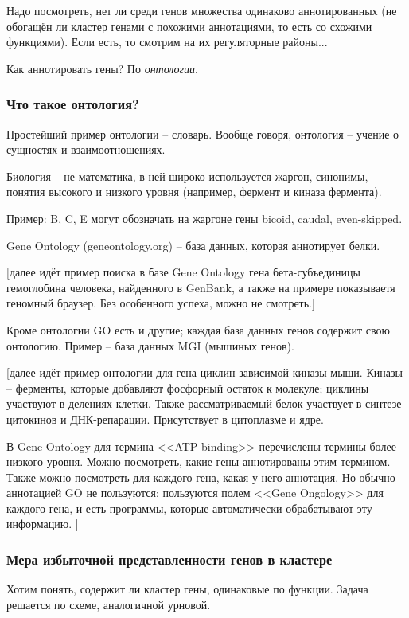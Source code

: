 \documentclass[main.tex]{subfiles}
\begin{document}

Надо посмотреть, нет ли среди генов множества одинаково аннотированных (не обогащён ли кластер генами с похожими аннотациями, то есть со схожими функциями).
Если есть, то смотрим на их регуляторные районы...

Как аннотировать гены?
По \emph{онтологии}.

\subsubsection{Что такое онтология?}
Простейший пример онтологии -- словарь.
Вообще говоря, онтология -- учение о сущностях и взаимоотношениях.

Биология -- не математика, в ней широко используется жаргон, синонимы, понятия высокого и низкого уровня (например, фермент и киназа фермента).

Пример: B, C, E могут обозначать на жаргоне гены bicoid, caudal, even-skipped.

Gene Ontology (geneontology.org) -- база данных, которая аннотирует белки.

[далее идёт пример поиска в базе Gene Ontology гена бета-субъединицы гемоглобина человека, найденного в GenBank, а также на примере показываетя геномный браузер. Без особенного успеха, можно не смотреть.]

Кроме онтологии GO есть и другие; каждая база данных генов содержит свою онтологию.
Пример -- база данных MGI (мышиных генов).

[далее идёт пример онтологии для гена циклин-зависимой киназы мыши.
Киназы -- ферменты, которые добавляют фосфорный остаток к молекуле; циклины участвуют в делениях клетки.
Также рассматриваемый белок участвует в синтезе цитокинов и ДНК-репарации.
Присутствует в цитоплазме и ядре.

В Gene Ontology для термина <<ATP binding>> перечислены термины более низкого уровня.
Можно посмотреть, какие гены аннотированы этим термином.
Также можно посмотреть для каждого гена, какая у него аннотация.
Но обычно аннотацией GO не пользуются: пользуются полем <<Gene Ongology>> для каждого гена, и есть программы, которые автоматически обрабатывают эту информацию. ]

\subsubsection{Мера избыточной представленности генов в кластере}

Хотим понять, содержит ли кластер гены, одинаковые по функции.
Задача решается по схеме, аналогичной урновой.
\end{document}
